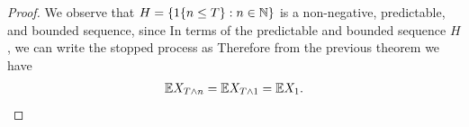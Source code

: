 \documentclass[a4paper,10pt,english]{article}
\begin{document}
\begin{proof}
We observe that $H = \{1\{n\leq T\}: n \in \mathbb{N}\}$ is a non-negative, predictable, and bounded sequence, since 
In terms of the predictable and bounded sequence $H$, we can write the stopped process as
Therefore from the previous theorem we have 
\begin{align*}
      \mathbb{E} X_{T\wedge n} =\mathbb{E} X_{T\wedge 1} =\mathbb{E} X_{1}. 
\end{align*}


\end{proof}
\end{document}
